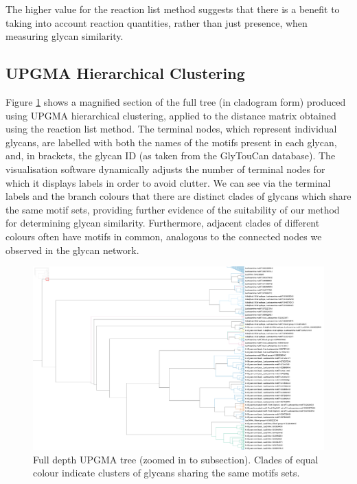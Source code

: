 \documentclass[12pt,a4paper]{article}
\begin{document}
The higher value for the reaction list method suggests that there is a benefit to taking into account reaction quantities, rather than just presence, when measuring glycan similarity.

\subsection{UPGMA Hierarchical Clustering}
\label{sec:clustering_results}

Figure \ref{fig:full_tree_zoomed} shows a magnified section of the full tree (in cladogram form) produced using UPGMA hierarchical clustering, applied to the distance matrix obtained using the reaction list method. The terminal nodes, which represent individual glycans, are labelled with both the names of the motifs present in each glycan, and, in brackets, the glycan ID (as taken from the GlyTouCan database). The visualisation software dynamically adjusts the number of terminal nodes for which it displays labels in order to avoid clutter. We can see via the terminal labels and the branch colours that there are distinct clades of glycans which share the same motif sets, providing further evidence of the suitability of our method for determining glycan similarity. Furthermore, adjacent clades of different colours often have motifs in common, analogous to the connected nodes we observed in the glycan network.

\begin{figure}
\centering 
\includegraphics[scale=0.3]{trees/zoomed_full_tree_cladogram.png} 
\caption{Full depth UPGMA tree (zoomed in to subsection). Clades of equal colour indicate clusters of glycans sharing the same motifs sets.}
\label{fig:full_tree_zoomed}
\end{figure}
\clearpage
\end{document}
